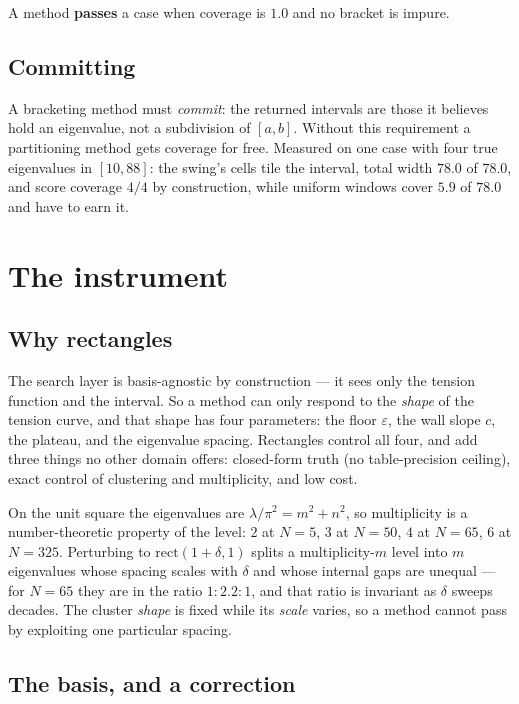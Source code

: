 \documentclass[11pt,a4paper]{article}
\newcommand{\lam}{\ensuremath{\lambda}}
\begin{document}
\noindent
A method \textbf{passes} a case when coverage is $1.0$ and no bracket is impure.

\subsection{Committing}

A bracketing method must \emph{commit}: the returned intervals are those it believes hold an
eigenvalue, not a subdivision of $[a,b]$. Without this requirement a partitioning method gets
coverage for free. Measured on one case with four true eigenvalues in $[10, 88]$: the swing's
cells tile the interval, total width $78.0$ of $78.0$, and score coverage $4/4$ by
construction, while uniform windows cover $5.9$ of $78.0$ and have to earn it.

\section{The instrument}

\subsection{Why rectangles}

The search layer is basis-agnostic by construction --- it sees only the tension function and the
interval. So a method can only respond to the \emph{shape} of the tension curve, and that shape
has four parameters: the floor $\varepsilon$, the wall slope $c$, the plateau, and the eigenvalue
spacing. Rectangles control all four, and add three things no other domain offers: closed-form
truth (no table-precision ceiling), exact control of clustering and multiplicity, and low cost.

On the unit square the eigenvalues are $\lam/\pi^2 = m^2 + n^2$, so multiplicity is a
number-theoretic property of the level: $2$ at $N=5$, $3$ at $N=50$, $4$ at $N=65$, $6$ at
$N=325$. Perturbing to $\mathrm{rect}(1+\delta, 1)$ splits a multiplicity-$m$ level into $m$
eigenvalues whose spacing scales with $\delta$ and whose internal gaps are unequal --- for
$N=65$ they are in the ratio $1 : 2.2 : 1$, and that ratio is invariant as $\delta$ sweeps
decades. The cluster \emph{shape} is fixed while its \emph{scale} varies, so a method cannot
pass by exploiting one particular spacing.

\subsection{The basis, and a correction}
\label{sec:basis}
\end{document}
